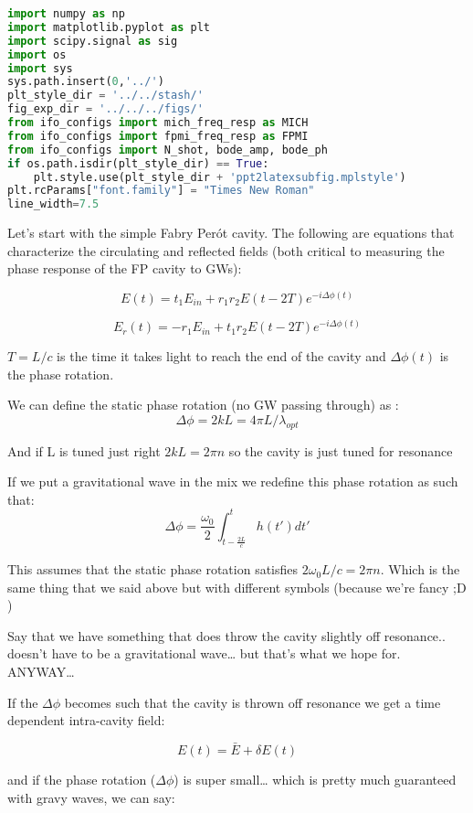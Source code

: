 \begin{lstlisting}[frame=single, language=Python]
import numpy as np 
import matplotlib.pyplot as plt
import scipy.signal as sig
import os
import sys
sys.path.insert(0,'../')
plt_style_dir = '../../stash/'
fig_exp_dir = '../../../figs/'
from ifo_configs import mich_freq_resp as MICH
from ifo_configs import fpmi_freq_resp as FPMI
from ifo_configs import N_shot, bode_amp, bode_ph
if os.path.isdir(plt_style_dir) == True:
    plt.style.use(plt_style_dir + 'ppt2latexsubfig.mplstyle')
plt.rcParams["font.family"] = "Times New Roman"
line_width=7.5
\end{lstlisting}

Let's start with the simple Fabry Perót cavity. The following are
equations that characterize the circulating and reflected fields (both
critical to measuring the phase response of the FP cavity to GWs):

\[
E(t) = t_1 E_{in} + r_1 r_2 E(t - 2T) e^{-i \Delta \phi(t)} 
\]

\[
E_r(t) = -r_1 E_{in} + t_1 r_2 E(t - 2T) e^{-i \Delta \phi(t)}
\]

\(T = L/c\) is the time it takes light to reach the end of the cavity
and \(\Delta \phi(t)\) is the phase rotation.

We can define the static phase rotation (no GW passing through) as :
\[\Delta \phi = 2kL = 4 \pi L /\lambda_{opt}  \]

And if L is tuned just right \(2kL = 2 \pi n\) so the cavity is just
tuned for resonance

If we put a gravitational wave in the mix we redefine this phase
rotation as such that:
\[\Delta \phi =  \frac{\omega_0}{2} \int_{t-\frac{2L}{c}}^{t} h(t')dt' \]

This assumes that the static phase rotation satisfies
\(2\omega_0L/c = 2 \pi n\). Which is the same thing that we said above
but with different symbols (because we're fancy ;D )

Say that we have something that does throw the cavity slightly off
resonance.. doesn't have to be a gravitational wave\ldots{} but that's
what we hope for. ANYWAY\ldots{}

If the \(\Delta \phi\) becomes such that the cavity is thrown off
resonance we get a time dependent intra-cavity field:

\[ E(t) = \bar{E} + \delta E(t) \]

and if the phase rotation (\(\Delta \phi\)) is super small\ldots{} which
is pretty much guaranteed with gravy waves, we can say:

